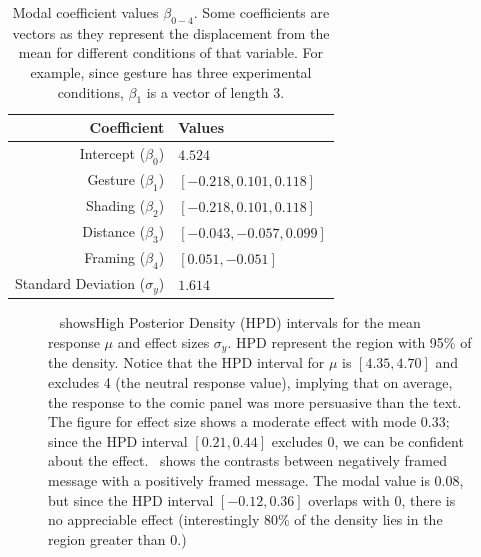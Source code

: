 \begin{table}[htb]%
 \centering
 \caption{Modal coefficient values $\beta_{0-4}$. Some coefficients are vectors as they represent the displacement from the mean for different conditions of that variable. For example, since gesture has three experimental conditions, $\beta_1$ is a vector of length 3.}\label{tab:modal values}
 \begin{tabular}{@{}rl@{}} \toprule
  Coefficient                     & Values                     \\ \midrule
  Intercept ($\beta_0$)           & $4.524$                    \\
  Gesture ($\beta_1$)             & $[-0.218, 0.101, 0.118]$   \\
  Shading ($\beta_2$)             & $ [-0.218 , 0.101, 0.118]$ \\
  Distance ($\beta_3$)            & $[-0.043, -0.057, 0.099]$  \\
  Framing ($\beta_4$)             & $[ 0.051, -0.051]$         \\
  Standard Deviation ($\sigma_y$) & $1.614$                    \\ \bottomrule
 \end{tabular}
\end{table}


\begin{figure}
  \hfill
 \caption{~ showsHigh Posterior Density (HPD) intervals for the mean response $\mu$ and effect sizes $\sigma_y$. HPD represent the region with 95\% of the density. Notice that the HPD interval for $\mu$ is $[4.35, 4.70]$ and excludes 4 (the neutral response value), implying that on average, the response to the comic panel was more persuasive than the text. The figure for effect size shows a moderate effect with mode $0.33$; since the HPD interval $[0.21, 0.44]$ excludes 0, we can be confident about the effect.~ shows the contrasts between negatively framed message with a positively framed message. The modal value is $0.08$, but since the HPD interval $[-0.12, 0.36]$ overlaps with 0, there is no appreciable effect (interestingly 80\% of the density lies in the region greater than 0.)}
 \label{fig:main-experiment-effect}
\end{figure}

